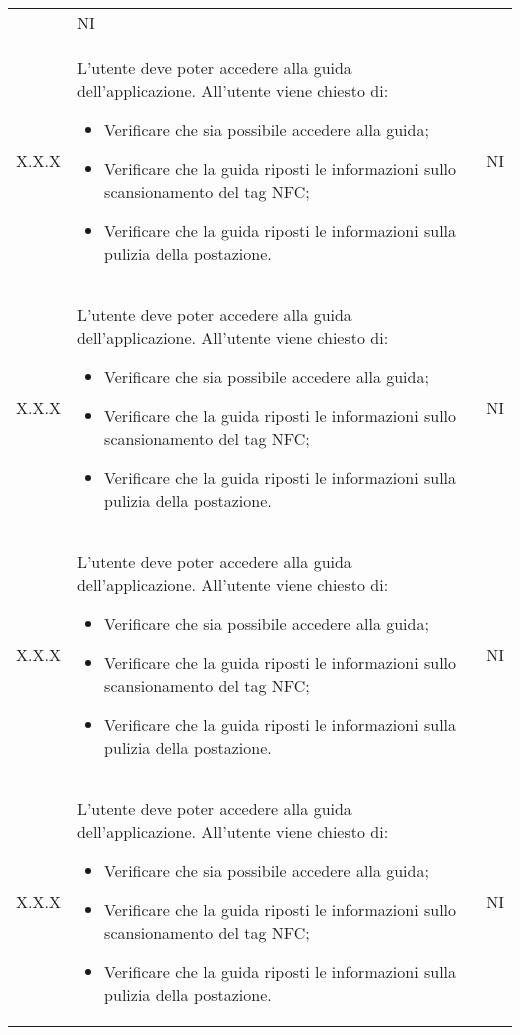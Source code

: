 {\begin{longtable}{ c C{10cm} c }
\begin{itemize}
        \end{itemize}&
        NI\\
        X.X.X&
        L'utente deve poter accedere alla guida dell'applicazione.\newline
        All'utente viene chiesto di:
        \begin{itemize}
            \item Verificare che sia possibile accedere alla guida;
            \item Verificare che la guida riposti le informazioni sullo scansionamento del tag NFC;
            \item Verificare che la guida riposti le informazioni sulla pulizia della postazione.
        \end{itemize}&
        NI\\
        X.X.X&
        L'utente deve poter accedere alla guida dell'applicazione.\newline
        All'utente viene chiesto di:
        \begin{itemize}
            \item Verificare che sia possibile accedere alla guida;
            \item Verificare che la guida riposti le informazioni sullo scansionamento del tag NFC;
            \item Verificare che la guida riposti le informazioni sulla pulizia della postazione.
        \end{itemize}&
        NI\\
        X.X.X&
        L'utente deve poter accedere alla guida dell'applicazione.\newline
        All'utente viene chiesto di:
        \begin{itemize}
            \item Verificare che sia possibile accedere alla guida;
            \item Verificare che la guida riposti le informazioni sullo scansionamento del tag NFC;
            \item Verificare che la guida riposti le informazioni sulla pulizia della postazione.
        \end{itemize}&
        NI\\
        X.X.X&
        L'utente deve poter accedere alla guida dell'applicazione.\newline
        All'utente viene chiesto di:
        \begin{itemize}
            \item Verificare che sia possibile accedere alla guida;
            \item Verificare che la guida riposti le informazioni sullo scansionamento del tag NFC;
            \item Verificare che la guida riposti le informazioni sulla pulizia della postazione.
        \end{itemize}&
        NI\\
        

\end{longtable}}
